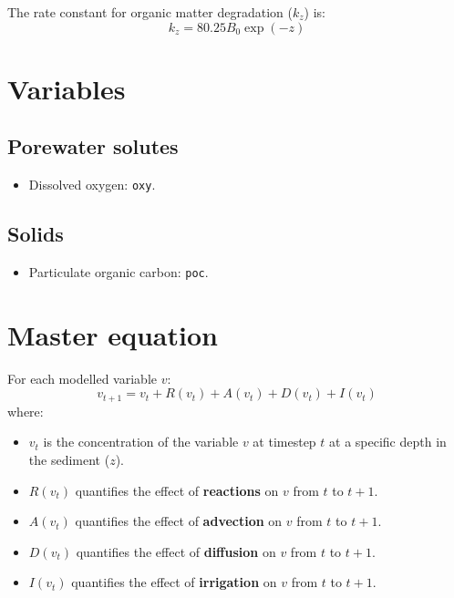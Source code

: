 \documentclass{article}
\newcommand{\code}[1]{\texttt{#1}}
\begin{document}
The rate constant for organic matter degradation ($k_z$) is:
\begin{equation}\label{k_poc_degradation}
k_z = 80.25 B_0 \exp(-z)
\end{equation}

\section{Variables}

\subsection{Porewater solutes}

\begin{itemize}
  \item Dissolved oxygen: \code{oxy}.
\end{itemize}

\subsection{Solids}

\begin{itemize}
  \item Particulate organic carbon: \code{poc}.
\end{itemize}

\section{Master equation}

For each modelled variable $v$:
\begin{equation}
v_{t+1} = v_t + R(v_t) + A(v_t) + D(v_t) + I(v_t)
\end{equation}
where:
\begin{itemize}
  \item $v_t$ is the concentration of the variable $v$ at timestep $t$ at a specific depth in the sediment ($z$).
  \item $R(v_t)$ quantifies the effect of \textbf{reactions} on $v$ from $t$ to $t+1$.
  \item $A(v_t)$ quantifies the effect of \textbf{advection} on $v$ from $t$ to $t+1$.
  \item $D(v_t)$ quantifies the effect of \textbf{diffusion} on $v$ from $t$ to $t+1$.
  \item $I(v_t)$ quantifies the effect of \textbf{irrigation} on $v$ from $t$ to $t+1$.
\end{itemize}
\end{document}
